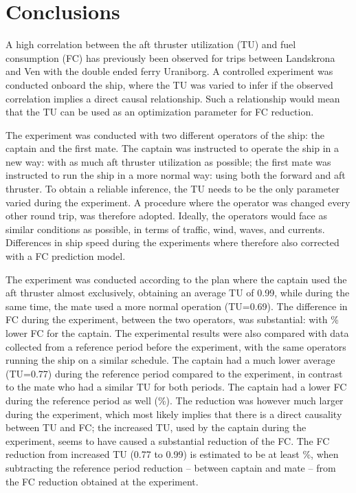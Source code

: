 \section{Conclusions}
A high correlation between the aft thruster utilization (TU) and fuel consumption (FC) has previously been observed for trips between Landskrona and Ven with the double ended ferry Uraniborg.  A controlled experiment was conducted onboard the ship, where the TU was varied to infer if the observed correlation implies a direct causal relationship. Such a relationship would mean that the TU can be used as an optimization parameter for FC reduction.

The experiment was conducted with two different operators of the ship: the captain and the first mate. The captain was instructed to operate the ship in a new way: with as much aft thruster utilization as possible; the first mate was instructed to run the ship in a more normal way: using both the forward and aft thruster.
To obtain a reliable inference, the TU needs to be the only parameter varied during the experiment. A procedure where the operator was changed every other round trip, was therefore adopted. Ideally, the operators would face as similar conditions as possible, in terms of traffic, wind, waves, and currents.
Differences in ship speed during the experiments where therefore also corrected with a FC prediction model.

The experiment was conducted according to the plan where the captain used the aft thruster almost exclusively, obtaining an average TU of 0.99, while during the same time, the mate used a more normal operation (TU=0.69). The difference in FC during the experiment, between the two operators, was substantial: with \savingpctexperiment \% lower FC for the captain. 
The experimental results were also compared with data collected from a reference period before the experiment, with the same operators running the ship on a similar schedule. The captain had a much lower average (TU=0.77) during the reference period compared to the experiment, in contrast to the mate who had a similar TU for both periods. The captain had a lower FC during the reference period as well (\savingpctbeforeexperiment \%).
The reduction was however much larger during the experiment, which most likely implies that there is a direct causality between TU and FC; the increased TU, used by the captain during the experiment, seems to have caused a substantial reduction of the FC. The FC reduction from increased TU (0.77 to 0.99) is estimated to be at least \savingthrusterallocationpct \%, when subtracting the reference period reduction -- between captain and mate -- from the FC reduction obtained at the experiment. 

